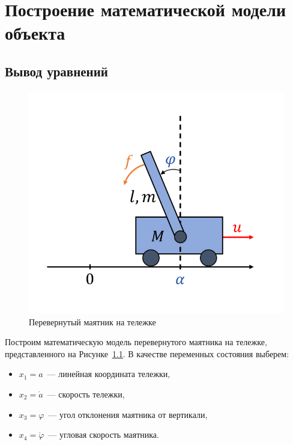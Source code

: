 \chapter{Построение математической модели объекта}

\section{Вывод уравнений}

\begin{figure}[H]
    \centering
    \includegraphics[width=0.5\linewidth]{figs/cart.png}
    \caption{Перевернутый маятник на тележке}
    \label{fig:cart}
\end{figure}









Построим математическую модель перевернутого маятника на тележке, 
представленного на Рисунке~\ref{fig:cart}. В качестве переменных состояния выберем:
\begin{itemize}
    \item $x_1 = a$~--- линейная координата тележки,
    \item $x_2 = \dot{a}$~--- скорость тележки,
    \item $x_3 = \varphi$~--- угол отклонения маятника от вертикали,
    \item $x_4 = \dot{\varphi}$~--- угловая скорость маятника.
\end{itemize}


